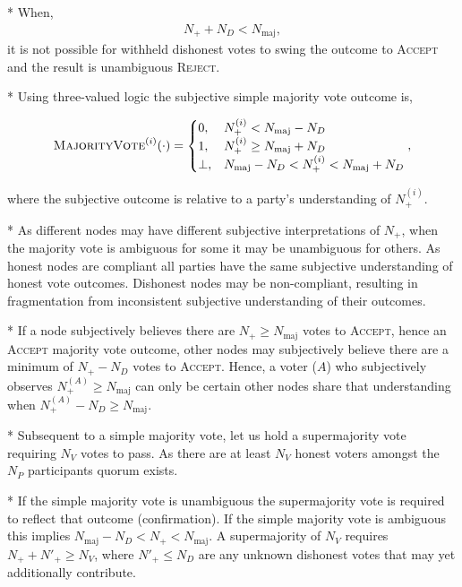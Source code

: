 * When,
\begin{align}
	N_+ + N_D < N_\mathrm{maj},
\end{align}
it is not possible for withheld dishonest votes to swing the outcome to \textsc{Accept} and the result is unambiguous \textsc{Reject}.

* Using three-valued logic the subjective simple majority vote outcome is,
\begin{widetext}
	\begin{align*}
		\textsc{MajorityVote}^{(i)}(\cdot) = \begin{cases}
			                                     0,    & N_+^{(i)} < N_\mathrm{maj} - N_D                        \\
			                                     1,    & N_+^{(i)} \geq N_\mathrm{maj} + N_D                     \\
			                                     \bot, & N_\mathrm{maj} - N_D < N_+^{(i)} < N_\mathrm{maj} + N_D
		                                     \end{cases},
	\end{align*}
\end{widetext}
where the subjective outcome is relative to a party's understanding of $N_+^{(i)}$.

* As different nodes may have different subjective interpretations of $N_+$, when the majority vote is ambiguous for some it may be unambiguous for others. As honest nodes are compliant all parties have the same subjective understanding of honest vote outcomes. Dishonest nodes may be non-compliant, resulting in fragmentation from inconsistent subjective understanding of their outcomes.

* If a node subjectively believes there are $N_+ \geq N_\mathrm{maj}$ votes to \textsc{Accept}, hence an \textsc{Accept} majority vote outcome, other nodes may subjectively believe there are a minimum of $N_+ - N_D$ votes to \textsc{Accept}. Hence, a voter ($A$) who subjectively observes $N_+^{(A)} \geq N_\mathrm{maj}$ can only be certain other nodes share that understanding when $N_+^{(A)} - N_D \geq N_\mathrm{maj}$.

* Subsequent to a simple majority vote, let us hold a supermajority vote requiring $N_V$ votes to pass. As there are at least $N_V$ honest voters amongst the $N_P$ participants quorum exists.

* If the simple majority vote is unambiguous the supermajority vote is required to reflect that outcome (confirmation). If the simple majority vote is ambiguous this implies $N_\mathrm{maj} - N_D < N_+ < N_\mathrm{maj}$. A supermajority of $N_V$ requires $N_+ + N'_+ \geq N_V$, where $N'_+\leq N_D$ are any unknown dishonest votes that may yet additionally contribute.

